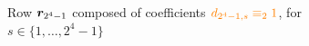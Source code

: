 
\begin{figure}[htb]

    \noindent{}

    \captionsetup{singlelinecheck=off}
    \caption[Row $\vect{r}_{2^{4}-1}$ of $\mathcal{C}_{\equiv_{2}}$]{
        Row $\vect{r}_{2^{4}-1}$ composed of coefficients $\textcolor{orange}{d_{2^{4}-1,s} \equiv_{2} 1}$, 
        for $s\in\lbrace1,\ldots,2^{4}-1 \rbrace$ }

    \label{fig:catalan-odd-row}

\end{figure}
